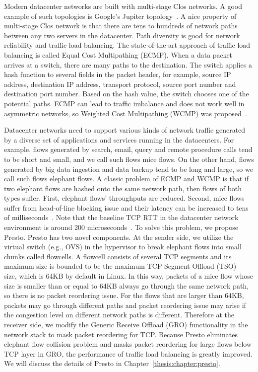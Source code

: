 Modern datacenter networks are built with multi-stage Clos networks. 
A good example of such topologies is Google's Jupiter topology~\cite{singh2015jupiter}. 
A nice property of multi-stage Clos network is that there are tens to hundreds of 
network paths between any two servers in the datacenter. Path diversity is good for network 
reliability and traffic load balancing. The state-of-the-art approach of traffic load balancing 
is called Equal Cost Multipathing (ECMP). When a data packet arrives at a switch, 
there are many paths to the destination. The switch applies a hash function to several 
fields in the packet header, for example, source IP address, destination IP address, 
transport protocol, source port number and destination port number. Based on the hash value, 
the switch chooses one of the potential paths. ECMP can lead to traffic imbalance and 
does not work well in asymmetric networks, so Weighted Cost Multipathing (WCMP) was proposed~\cite{wcmp}.

Datacenter networks need to support various kinds of network traffic generated by 
a diverse set of applications and services running in the datacenters. For example, flows generated 
by search, email, query and remote procedure calls tend to be short and small, and we call such flows mice flows. 
On the other hand, flows generated by big data ingestion and data backup tend to be long and large, 
so we call such flows elephant flows. A classic problem of ECMP and WCMP is that if two elephant flows 
are hashed onto the same network path, then flows of both types suffer. First, elephant flows' throughputs are reduced. 
Second, mice flows suffer from head-of-line blocking issue and their latency can be increased to 
tens of milliseconds~\cite{alizadeh2012less}. 
Note that the baseline TCP RTT in the datacenter network environment is around 200 microseconds~\cite{he2016ac}. 
To solve this problem, we propose Presto. Presto has two novel components. At the sender side, 
we utilize the virtual switch (e.g., OVS) in the hypervisor to break elephant flows into small chunks 
called flowcells. A flowcell consists of several TCP segments and its maximum size is bounded to be the 
maximum TCP Segment Offload (TSO)~\cite{tcp-segment-offload} size, 
which is 64KB by default in Linux. In this way, packets of a mice flow whose size 
is smaller than or equal to 64KB always go through the same network path, so there is no packet reordering issue. 
For the flows that are larger than 64KB, packets may go through different paths and packet reordering 
issue may arise if the congestion level on different network paths is different. 
Therefore at the receiver side, we modify the Generic Receive Offload (GRO) functionality in the network stack to 
mask packet reordering for TCP. Because Presto eliminates elephant flow collision problem and 
masks packet reordering for large flows below TCP layer in GRO, the performance of 
traffic load balancing is greatly improved.
We will discuss the details of Presto in Chapter~\ref{thesis:chapter:presto}.


